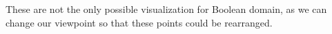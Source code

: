 \begin{remark}
    These are not the only possible visualization for Boolean domain, as we can change
    our viewpoint so that these points could be rearranged.
\end{remark}